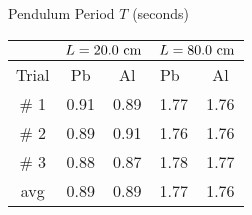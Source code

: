 %
\begin{table}[hbtp]
\begin{center}
Pendulum Period $T$ (seconds)\\
\begin{tabular}{| c | c | c | c | c | }
\hline
&\multicolumn{2}{c}{$L=20.0~{\rm cm}$} \vrule
&\multicolumn{2}{c}{$L=80.0~{\rm cm}$} \vrule\\
\hline
Trial & \phantom{ }Pb\phantom{ } & Al & \phantom{ }Pb\phantom{ }\  & Al \\
\hline
\# 1 & 0.91 & 0.89 & 1.77 & 1.76 \\
\hline
\# 2 & 0.89 & 0.91 & 1.76 & 1.76 \\
\hline
\# 3 & 0.88 & 0.87 & 1.78 & 1.77 \\
\hline
avg  & 0.89 & 0.89 & 1.77 & 1.76 \\
\hline
\end{tabular}
\label{t:1}
\end{center}
\end{table}
